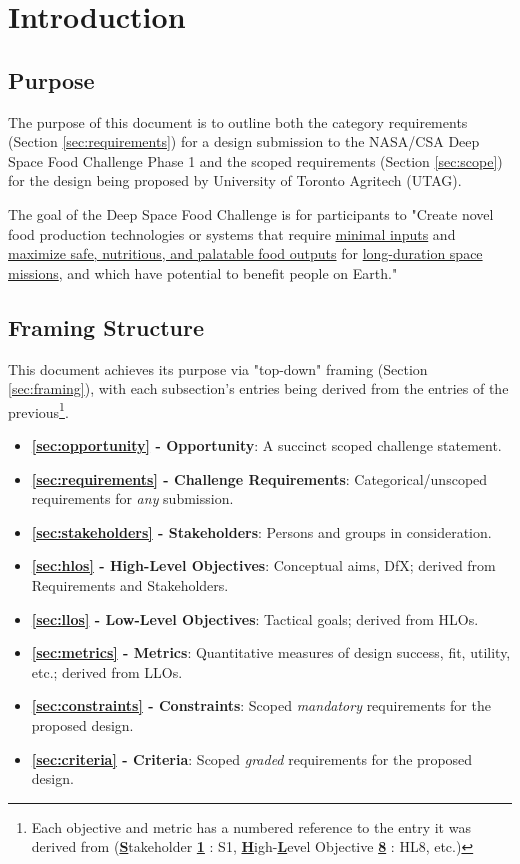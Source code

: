 \documentclass{report}
\begin{document}
\thispagestyle{plain}

\tableofcontents
\newpage

\section{Introduction}
\label{sec:intro}

\subsection{Purpose}
\label{sec:purpose}

The purpose of this document is to outline both the category requirements (Section \ref{sec:requirements}) for a design submission to the NASA/CSA Deep Space Food Challenge Phase 1 \cite{dsfc} and the scoped requirements (Section \ref{sec:scope}) for the design being proposed by University of Toronto Agritech (UTAG).

The goal of the Deep Space Food Challenge is for participants to "Create novel food production technologies or systems that require \uline{minimal inputs} and \uline{maximize safe, nutritious, and palatable food outputs} for \uline{long-duration space missions}, and which have potential to benefit people on Earth." \cite{applicantguide}

\subsection{Framing Structure}
\label{sec:structure}

This document achieves its purpose via "top-down" framing (Section \ref{sec:framing}), with each subsection's entries being derived from the entries of the
previous\footnote{Each objective and metric has a numbered reference to the entry it was derived from (\uline{\textbf{S}}takeholder \uline{\textbf{1}} : S1, \uline{\textbf{H}}igh-\uline{\textbf{L}}evel Objective \uline{\textbf{8}} : HL8, etc.)}.
\begin{itemize}
    \item \textbf{\ref{sec:opportunity} - Opportunity}: A succinct scoped challenge statement.
    \item \textbf{\ref{sec:requirements} - Challenge Requirements}: Categorical/unscoped requirements for \textit{any} submission.
    \item \textbf{\ref{sec:stakeholders} - Stakeholders}: Persons and groups in consideration.
    \item \textbf{\ref{sec:hlos} - High-Level Objectives}: Conceptual aims, DfX; derived from Requirements and Stakeholders.
    \item \textbf{\ref{sec:llos} - Low-Level Objectives}: Tactical goals; derived from HLOs.
    \item \textbf{\ref{sec:metrics} - Metrics}: Quantitative measures of design success, fit, utility, etc.; derived from LLOs.
    \item \textbf{\ref{sec:constraints} - Constraints}: Scoped \textit{mandatory} requirements for the proposed design.
    \item \textbf{\ref{sec:criteria} - Criteria}: Scoped \textit{graded} requirements for the proposed design.
\end{itemize}
\end{document}

